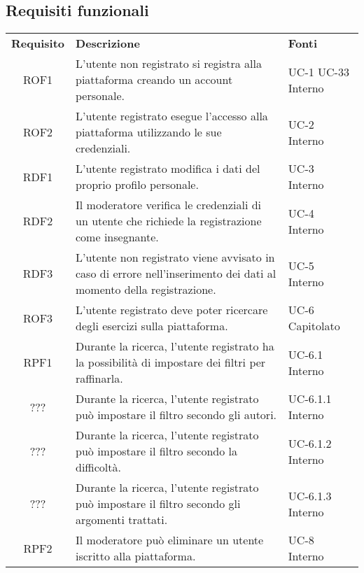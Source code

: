 \subsection{Requisiti funzionali}
\begin{tabularx}{\textwidth}{| c | p{10cm} | X |}
		\rowcolor{LightBlue}
		\color{white}\bfseries Requisito & \color{white}\bfseries Descrizione & \color{white}\bfseries Fonti\\[0.25cm]
		ROF1 & L'utente non registrato si registra alla piattaforma creando un account personale. & UC-1 \newline UC-33 \newline Interno\\
		ROF2 & L'utente registrato esegue l'accesso alla piattaforma utilizzando le sue credenziali. & UC-2 \newline Interno\\
		RDF1 & L'utente registrato modifica i dati del proprio profilo personale. & UC-3 \newline Interno\\
		RDF2 & Il moderatore verifica le credenziali di un utente che richiede la registrazione come insegnante. & UC-4 \newline Interno\\
		RDF3 & L'utente non registrato viene avvisato in caso di errore nell'inserimento dei dati al momento della registrazione. & UC-5 \newline Interno\\
		ROF3 & L'utente registrato deve poter ricercare degli esercizi sulla piattaforma. & UC-6 \newline Capitolato\\
		RPF1 & Durante la ricerca, l'utente registrato ha la possibilità di impostare dei filtri per raffinarla. & UC-6.1 \newline Interno\\
		??? & Durante la ricerca, l'utente registrato può impostare il filtro secondo gli autori. & UC-6.1.1 \newline Interno\\
		??? & Durante la ricerca, l'utente registrato può impostare il filtro secondo la difficoltà. & UC-6.1.2 \newline Interno\\
		??? & Durante la ricerca, l'utente registrato può impostare il filtro secondo gli argomenti trattati. & UC-6.1.3 \newline Interno\\
		RPF2 & Il moderatore può eliminare un utente iscritto alla piattaforma. & UC-8 \newline Interno\\

\end{tabularx}
